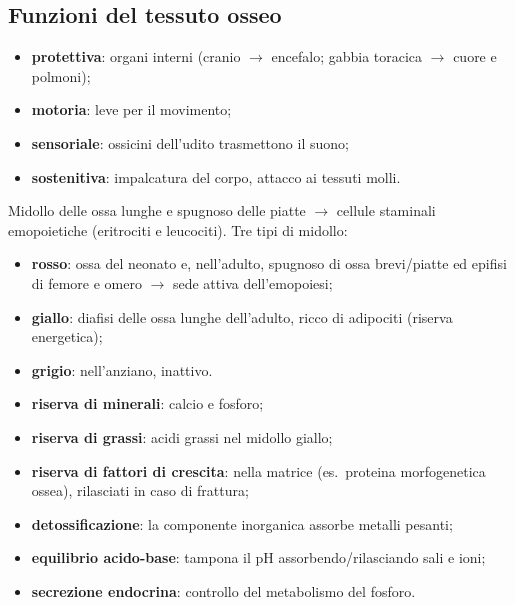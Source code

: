 \subsection{Funzioni del tessuto osseo}
\begin{itemize}
  \item \textbf{protettiva}: organi interni (cranio $\rightarrow$ encefalo; gabbia toracica
    $\rightarrow$ cuore e polmoni);
  \item \textbf{motoria}: leve per il movimento;
  \item \textbf{sensoriale}: ossicini dell'udito trasmettono il suono;
  \item \textbf{sostenitiva}: impalcatura del corpo, attacco ai tessuti molli.
\end{itemize}
Midollo delle ossa lunghe e spugnoso delle piatte $\rightarrow$ cellule staminali emopoietiche
(eritrociti e leucociti). Tre tipi di midollo:
\begin{itemize}
  \item \textbf{rosso}: ossa del neonato e, nell'adulto, spugnoso di ossa brevi/piatte ed epifisi
    di femore e omero $\rightarrow$ sede attiva dell'emopoiesi;
  \item \textbf{giallo}: diafisi delle ossa lunghe dell'adulto, ricco di adipociti (riserva
    energetica);
  \item \textbf{grigio}: nell'anziano, inattivo.
\end{itemize}
\begin{itemize}
  \item \textbf{riserva di minerali}: calcio e fosforo;
  \item \textbf{riserva di grassi}: acidi grassi nel midollo giallo;
  \item \textbf{riserva di fattori di crescita}: nella matrice (es.\ proteina morfogenetica ossea),
    rilasciati in caso di frattura;
  \item \textbf{detossificazione}: la componente inorganica assorbe metalli pesanti;
  \item \textbf{equilibrio acido-base}: tampona il pH assorbendo/rilasciando sali e ioni;
  \item \textbf{secrezione endocrina}: controllo del metabolismo del fosforo.
\end{itemize}

